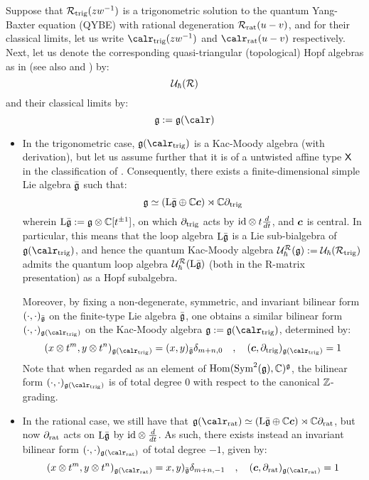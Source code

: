         Suppose that $\mathcal{R}_{\mathrm{trig}}(zw^{-1})$ is a trigonometric solution to the quantum Yang-Baxter equation (QYBE) with rational degeneration $\mathcal{R}_{\mathrm{rat}}(u - v)$, and for their classical limits, let us write $\calr_{\trigonometric}(zw^{-1})$ and $\calr_{\rational}(u - v)$ respectively. Next, let us denote the corresponding quasi-triangular (topological) Hopf algebras as in \cite{etingof_kazhdan_quantisation_1} (see also \cite{etingof_kazhdan_quantisation_1} and \cite{etingof_kazhdan_quantisation_6}) by:
            $$\mathcal{U}_{\hbar}(\mathcal{R})$$
        and their classical limits by:
            $$\g := \g(\calr)$$
        \begin{itemize}
            \item In the trigonometric case, $\g(\calr_{\trigonometric})$ is a Kac-Moody algebra (with derivation), but let us assume further that it is of a untwisted affine type $\mathsf{X}$ in the classification of \cite[Chapter 4]{kac_infinite_dimensional_lie_algebras}. Consequently, there exists a finite-dimensional simple Lie algebra $\bar{\mathfrak{g}}$ such that:
                $$\mathfrak{g} \simeq ( \mathrm{L} \bar{\mathfrak{g}} \oplus \mathbb{C} \boldsymbol{c} ) \rtimes \mathbb{C} \partial_{\mathrm{trig}}$$
            wherein $\Loop \bar{\g} := \g \tensor \bbC[t^{\pm 1}]$, on which $\partial_{\mathrm{trig}}$ acts by $\id \tensor t\frac{d}{dt}$, and $\boldsymbol{c}$ is central. In particular, this means that the loop algebra $\mathrm{L} \bar{\mathfrak{g}}$ is a Lie sub-bialgebra of $\g(\calr_{\trigonometric})$, and hence the quantum Kac-Moody algebra $\mathcal{U}_{\hbar}^{\mathcal{R}}(\mathfrak{g}) := \mathcal{U}_{\hbar}(\mathcal{R}_{\mathrm{trig}})$ admits the quantum loop algebra $\mathcal{U}_{\hbar}^{\mathcal{R}}(\mathrm{L} \bar{\mathfrak{g}})$ (both in the R-matrix presentation) as a Hopf subalgebra.

            Moreover, by fixing a non-degenerate, symmetric, and invariant bilinear form $(\cdot, \cdot)_{\bar{\mathfrak{g}}}$ on the finite-type Lie algebra $\bar{\mathfrak{g}}$, one obtains a similar bilinear form $(\cdot, \cdot)_{\g(\calr_{\trigonometric})}$ on the Kac-Moody algebra $\g := \g(\calr_{\trigonometric})$, determined by:
                $$(x \tensor t^m, y \tensor t^n)_{\g(\calr_{\trigonometric})} = (x, y)_{\bar{\g}} \delta_{m + n, 0} \quad, \quad (\level, \del_{\trigonometric})_{\g(\calr_{\trigonometric})} = 1$$
            Note that when regarded as an element of $\operatorname{Hom}(\operatorname{Sym}^2(\mathfrak{g}), \mathbb{C})^{\mathfrak{g}}$, the bilinear form $(\cdot, \cdot)_{\g(\calr_{\trigonometric})}$ is of total degree $0$ with respect to the canonical $\mathbb{Z}$-grading. 
            \item In the rational case, we still have that $\g(\calr_{\rational}) \cong ( \Loop \bar{\g} \oplus \bbC \level ) \rtimes \bbC \del_{\rational}$, but now $\partial_{\mathrm{rat}}$ acts on $\mathrm{L} \bar{\mathfrak{g}}$ by $\id \tensor \frac{d}{dt}$. As such, there exists instead an invariant bilinear form $(\cdot, \cdot)_{\g(\calr_{\rational})}$ of total degree $-1$, given by:
                $$(x \tensor t^m, y \tensor t^n)_{\g(\calr_{\rational})} = x, y)_{\bar{\g}} \delta_{m + n, -1} \quad, \quad (\level, \del_{\rational})_{\g(\calr_{\rational})} = 1$$
        \end{itemize}

